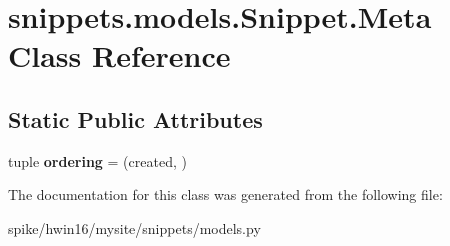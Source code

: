 \hypertarget{classsnippets_1_1models_1_1_snippet_1_1_meta}{}\section{snippets.\+models.\+Snippet.\+Meta Class Reference}
\label{classsnippets_1_1models_1_1_snippet_1_1_meta}
\subsection*{Static Public Attributes}
\begin{DoxyCompactItemize}
\item 
\mbox{\label{classsnippets_1_1models_1_1_snippet_1_1_meta_a5c59dd90a327bd10f7bfa725529f7423}} 
tuple {\bfseries ordering} = (\textquotesingle{}created\textquotesingle{}, )
\end{DoxyCompactItemize}


The documentation for this class was generated from the following file\+:\begin{DoxyCompactItemize}
\item 
spike/hwin16/mysite/snippets/models.\+py\end{DoxyCompactItemize}

